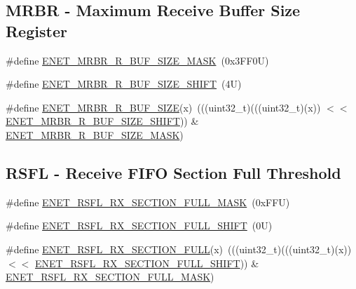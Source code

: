\subsection*{M\+R\+BR -\/ Maximum Receive Buffer Size Register}
\begin{DoxyCompactItemize}
\item 
\#define \mbox{\hyperlink{group___e_n_e_t___register___masks_ga376edb2860d9c55545ca78616f7d81f3}{E\+N\+E\+T\+\_\+\+M\+R\+B\+R\+\_\+\+R\+\_\+\+B\+U\+F\+\_\+\+S\+I\+Z\+E\+\_\+\+M\+A\+SK}}~(0x3\+F\+F0\+U)
\item 
\#define \mbox{\hyperlink{group___e_n_e_t___register___masks_ga97d12f7cd393b851484d3bbdcd4614b2}{E\+N\+E\+T\+\_\+\+M\+R\+B\+R\+\_\+\+R\+\_\+\+B\+U\+F\+\_\+\+S\+I\+Z\+E\+\_\+\+S\+H\+I\+FT}}~(4\+U)
\item 
\#define \mbox{\hyperlink{group___e_n_e_t___register___masks_ga236137ed06ec6b5e9bab8e945351da71}{E\+N\+E\+T\+\_\+\+M\+R\+B\+R\+\_\+\+R\+\_\+\+B\+U\+F\+\_\+\+S\+I\+ZE}}(x)~(((uint32\+\_\+t)(((uint32\+\_\+t)(x)) $<$$<$ \mbox{\hyperlink{group___e_n_e_t___register___masks_ga97d12f7cd393b851484d3bbdcd4614b2}{E\+N\+E\+T\+\_\+\+M\+R\+B\+R\+\_\+\+R\+\_\+\+B\+U\+F\+\_\+\+S\+I\+Z\+E\+\_\+\+S\+H\+I\+FT}})) \& \mbox{\hyperlink{group___e_n_e_t___register___masks_ga376edb2860d9c55545ca78616f7d81f3}{E\+N\+E\+T\+\_\+\+M\+R\+B\+R\+\_\+\+R\+\_\+\+B\+U\+F\+\_\+\+S\+I\+Z\+E\+\_\+\+M\+A\+SK}})
\end{DoxyCompactItemize}
\subsection*{R\+S\+FL -\/ Receive F\+I\+FO Section Full Threshold}
\begin{DoxyCompactItemize}
\item 
\#define \mbox{\hyperlink{group___e_n_e_t___register___masks_ga415bf81c3a615e8ee3c7cd5dddc5a9a2}{E\+N\+E\+T\+\_\+\+R\+S\+F\+L\+\_\+\+R\+X\+\_\+\+S\+E\+C\+T\+I\+O\+N\+\_\+\+F\+U\+L\+L\+\_\+\+M\+A\+SK}}~(0x\+F\+F\+U)
\item 
\#define \mbox{\hyperlink{group___e_n_e_t___register___masks_ga8d10ff4a7b7abbe2f089ccc4dddcdd46}{E\+N\+E\+T\+\_\+\+R\+S\+F\+L\+\_\+\+R\+X\+\_\+\+S\+E\+C\+T\+I\+O\+N\+\_\+\+F\+U\+L\+L\+\_\+\+S\+H\+I\+FT}}~(0\+U)
\item 
\#define \mbox{\hyperlink{group___e_n_e_t___register___masks_ga8fab46c0b08cc69ffba1bdce893dc57e}{E\+N\+E\+T\+\_\+\+R\+S\+F\+L\+\_\+\+R\+X\+\_\+\+S\+E\+C\+T\+I\+O\+N\+\_\+\+F\+U\+LL}}(x)~(((uint32\+\_\+t)(((uint32\+\_\+t)(x)) $<$$<$ \mbox{\hyperlink{group___e_n_e_t___register___masks_ga8d10ff4a7b7abbe2f089ccc4dddcdd46}{E\+N\+E\+T\+\_\+\+R\+S\+F\+L\+\_\+\+R\+X\+\_\+\+S\+E\+C\+T\+I\+O\+N\+\_\+\+F\+U\+L\+L\+\_\+\+S\+H\+I\+FT}})) \& \mbox{\hyperlink{group___e_n_e_t___register___masks_ga415bf81c3a615e8ee3c7cd5dddc5a9a2}{E\+N\+E\+T\+\_\+\+R\+S\+F\+L\+\_\+\+R\+X\+\_\+\+S\+E\+C\+T\+I\+O\+N\+\_\+\+F\+U\+L\+L\+\_\+\+M\+A\+SK}})
\end{DoxyCompactItemize}
